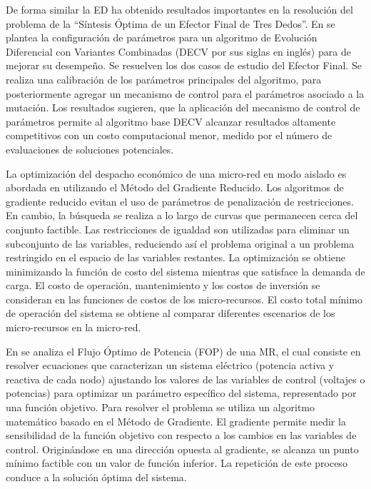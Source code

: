   De forma similar la ED ha obtenido resultados importantes en la resolución del problema de la ``Síntesis Óptima de un Efector Final de Tres Dedos''. En \cite{mezura-montes_dynamic_2015} se plantea la configuración de parámetros para un algoritmo de Evolución Diferencial con Variantes Combinadas (DECV por sus siglas en inglés) para de mejorar su desempeño. Se resuelven los dos casos de estudio del Efector Final. Se realiza una calibración de los parámetros principales del algoritmo, para posteriormente agregar un mecanismo de control para el parámetros asociado a la mutación. Los resultados sugieren, que la aplicación del mecanismo de control de parámetros permite al algoritmo base DECV alcanzar resultados altamente competitivos con un costo computacional menor, medido por el número de evaluaciones de soluciones potenciales.
  
  

  La optimización del despacho económico de una micro-red en modo aislado es abordada en \cite{ramabhotla2014economic} utilizando el Método del Gradiente Reducido.  Los algoritmos de gradiente reducido evitan el uso de parámetros de penalización de restricciones. En cambio, la búsqueda se realiza a lo largo de curvas que permanecen cerca del conjunto factible. Las restricciones de igualdad son utilizadas para eliminar un subconjunto de las variables, reduciendo así el problema original a un problema restringido en el espacio de las variables restantes. La optimización se obtiene minimizando la función de costo del sistema mientras que satisface la demanda de carga. El costo de operación, mantenimiento y los costos de inversión se consideran en las funciones de costos de los micro-recursos.  El costo total mínimo de operación del sistema se obtiene al comparar diferentes escenarios de los micro-recursos en la micro-red. 
  
 
 En \cite{heredia-ramirez_optimal_2014} se analiza el Flujo Óptimo de Potencia (FOP) de una MR, el cual consiste en resolver ecuaciones que caracterizan un sistema eléctrico (potencia activa y reactiva de cada nodo) ajustando los valores de las variables de control (voltajes o potencias) para optimizar un parámetro específico del sistema, representado por una función objetivo. Para resolver el problema se utiliza un algoritmo matemático basado en el Método de Gradiente. El gradiente permite medir la sensibilidad de la función objetivo con respecto a los cambios en las variables de control. Originándose en una dirección opuesta al gradiente, se alcanza un punto mínimo factible con un valor de función inferior. La repetición de este proceso conduce a la solución óptima del sistema.
 
